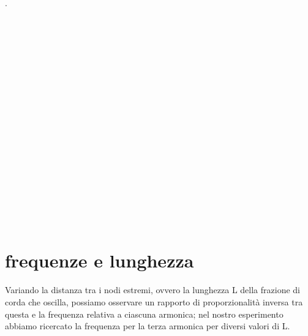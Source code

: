 \documentclass[a4paper]{article}
\theoremstyle{definition}
\begin{document}
\begin{figure}[!htbp]
\end{figure}
.\\\\\\\\\\\\\\\\\\\\\\\\\\\\\\\\\\\\\\
\section{frequenze e lunghezza}
Variando la distanza tra i nodi estremi, ovvero la lunghezza L della frazione di corda che oscilla, possiamo osservare un rapporto di proporzionalità inversa tra questa e la frequenza relativa a ciascuna armonica; nel nostro esperimento abbiamo ricercato la frequenza per la terza armonica per diversi valori di L.
\end{document}
